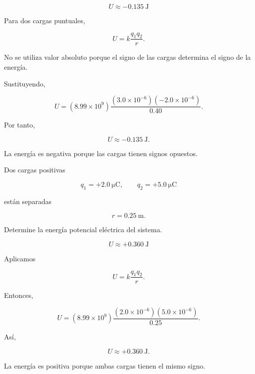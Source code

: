 \begin{respuesta}

\[
\boxed{U\approx-\SI{0.135}{\joule}}
\]

\end{respuesta}

\begin{explicacion}

Para dos cargas puntuales,

\[
U=k\frac{q_1q_2}{r}.
\]

No se utiliza valor absoluto porque el signo de las cargas determina el signo de la
energía.

Sustituyendo,

\[
U
=
(8.99\times10^9)
\frac{(3.0\times10^{-6})(-2.0\times10^{-6})}{0.40}.
\]

Por tanto,

\[
\boxed{U\approx-\SI{0.135}{\joule}}.
\]

La energía es negativa porque las cargas tienen signos opuestos.

\end{explicacion}


\begin{ejercicio}

Dos cargas positivas

\[
q_1=+\SI{2.0}{\micro\coulomb},
\qquad
q_2=+\SI{5.0}{\micro\coulomb}
\]

están separadas

\[
r=\SI{0.25}{\metre}.
\]

Determine la energía potencial eléctrica del sistema.

\end{ejercicio}

\begin{respuesta}

\[
\boxed{U\approx+\SI{0.360}{\joule}}
\]

\end{respuesta}

\begin{explicacion}

Aplicamos

\[
U=k\frac{q_1q_2}{r}.
\]

Entonces,

\[
U
=
(8.99\times10^9)
\frac{(2.0\times10^{-6})(5.0\times10^{-6})}{0.25}.
\]

Así,

\[
\boxed{U\approx+\SI{0.360}{\joule}}.
\]

La energía es positiva porque ambas cargas tienen el mismo signo.

\end{explicacion}


